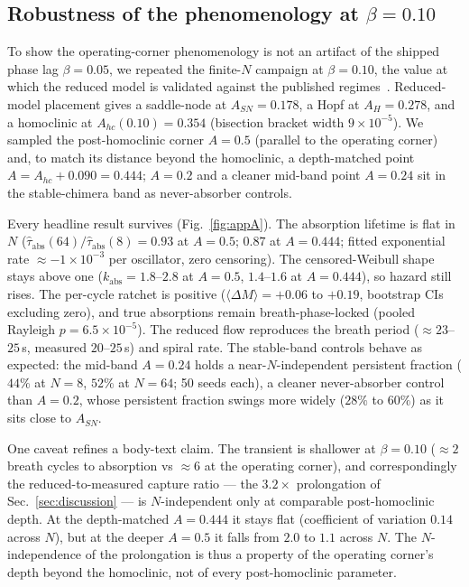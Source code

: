 \documentclass[pdflatex,sn-mathphys,Numbered]{sn-jnl}
\begin{document}
\begin{appendices}

\section{Robustness of the phenomenology at $\beta = 0.10$}\label{app:beta}

To show the operating-corner phenomenology is not an artifact of the shipped phase
lag $\beta = 0.05$, we repeated the finite-$N$ campaign at $\beta = 0.10$, the value
at which the reduced model is validated against the published
regimes~\cite{abrams2008}. Reduced-model placement gives a saddle-node at
$A_{SN} = 0.178$, a Hopf at $A_H = 0.278$, and a homoclinic at
$A_{hc}(0.10) = 0.354$ (bisection bracket width $9\times10^{-5}$). We sampled the
post-homoclinic corner $A = 0.5$ (parallel to the operating corner) and, to match its
distance beyond the homoclinic, a depth-matched point
$A = A_{hc} + 0.090 = 0.444$; $A = 0.2$ and a cleaner mid-band point $A = 0.24$ sit
in the stable-chimera band as never-absorber controls.

Every headline result survives (Fig.~\ref{fig:appA}). The absorption lifetime is flat
in $N$ ($\hat\tau_{\mathrm{abs}}(64)/\hat\tau_{\mathrm{abs}}(8) = 0.93$ at $A = 0.5$;
$0.87$ at $A = 0.444$; fitted exponential rate $\approx -1\times10^{-3}$ per
oscillator, zero censoring). The censored-Weibull shape stays above one
($k_{\mathrm{abs}} = 1.8$--$2.8$ at $A = 0.5$, $1.4$--$1.6$ at $A = 0.444$), so hazard
still rises. The per-cycle ratchet is positive
($\langle\Delta M\rangle = +0.06$ to $+0.19$, bootstrap CIs excluding zero), and true
absorptions remain breath-phase-locked (pooled Rayleigh $p = 6.5\times10^{-5}$). The
reduced flow reproduces the breath period ($\approx 23$--$25$\,s, measured
$20$--$25$\,s) and spiral rate. The stable-band controls behave as expected: the
mid-band $A = 0.24$ holds a near-$N$-independent persistent fraction ($44\%$ at
$N = 8$, $52\%$ at $N = 64$; 50 seeds each), a cleaner never-absorber control than
$A = 0.2$, whose persistent fraction swings more widely ($28\%$ to $60\%$) as it sits
close to $A_{SN}$.

One caveat refines a body-text claim. The transient is shallower at $\beta = 0.10$
($\approx 2$ breath cycles to absorption vs $\approx 6$ at the operating corner), and
correspondingly the reduced-to-measured capture ratio --- the $3.2\times$ prolongation
of Sec.~\ref{sec:discussion} --- is $N$-independent only at comparable post-homoclinic
depth. At the depth-matched $A = 0.444$ it stays flat (coefficient of variation $0.14$
across $N$), but at the deeper $A = 0.5$ it falls from $2.0$ to $1.1$ across $N$. The
$N$-independence of the prolongation is thus a property of the operating corner's
depth beyond the homoclinic, not of every post-homoclinic parameter.


\end{appendices}
\end{document}
